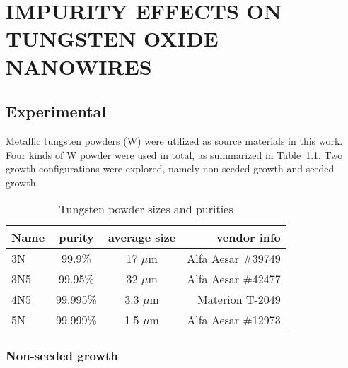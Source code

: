 
\chapter{IMPURITY EFFECTS ON TUNGSTEN OXIDE NANOWIRES}



\section{Experimental}
Metallic tungsten powders (W) were utilized as source materials in this work. Four kinds of W powder were used in total, as summarized in Table~\ref{tab:powder}. Two growth configurations were explored, namely non-seeded growth and seeded growth.
\begin{table}[htb]
\centering
\caption{Tungsten powder sizes and purities}\label{tab:powder}
\begin{tabular}{lccr}
\toprule
Name & purity & average size & vendor info\\
\midrule
3N   &  99.9\% & 17 $\mu$m & Alfa Aesar \#39749\\
3N5   &  99.95\% & 32 $\mu$m  & Alfa Aesar \#42477\\
4N5   &  99.995\% & 3.3 $\mu$m  & Materion T-2049 \\
5N   &  99.999\% & 1.5 $\mu$m & Alfa Aesar \#12973\\
\bottomrule
\end{tabular}
\end{table}

\subsection{Non-seeded growth}\label{sec:woxnonseed}

